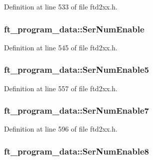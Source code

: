 Definition at line 533 of file ftd2xx.h.\hypertarget{structft__program__data_a4b2ef7f478af34cea6af64d0b0506c1e}{
\subsubsection[{SerNumEnable}]{ {\bf ft\_\-program\_\-data::SerNumEnable}}}
\label{structft__program__data_a4b2ef7f478af34cea6af64d0b0506c1e}


Definition at line 545 of file ftd2xx.h.\hypertarget{structft__program__data_a45d2edb9ee08c9d92c3d5d0d0ac79fd7}{
\subsubsection[{SerNumEnable5}]{ {\bf ft\_\-program\_\-data::SerNumEnable5}}}
\label{structft__program__data_a45d2edb9ee08c9d92c3d5d0d0ac79fd7}


Definition at line 557 of file ftd2xx.h.\hypertarget{structft__program__data_aced3a798466e623045b4c1cc891dcb93}{
\subsubsection[{SerNumEnable7}]{ {\bf ft\_\-program\_\-data::SerNumEnable7}}}
\label{structft__program__data_aced3a798466e623045b4c1cc891dcb93}


Definition at line 596 of file ftd2xx.h.\hypertarget{structft__program__data_ae2a623e2fc32537111ae317b4079fd2f}{
\subsubsection[{SerNumEnable8}]{ {\bf ft\_\-program\_\-data::SerNumEnable8}}}
\label{structft__program__data_ae2a623e2fc32537111ae317b4079fd2f}



